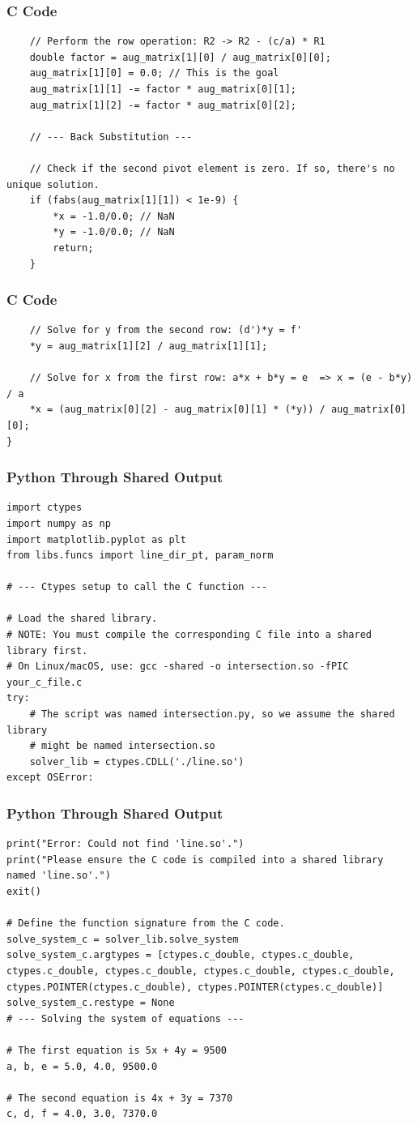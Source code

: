 \documentclass{beamer}
\begin{document}
\begin{frame}[fragile]
\frametitle{C Code}
\begin{lstlisting}
    // Perform the row operation: R2 -> R2 - (c/a) * R1
    double factor = aug_matrix[1][0] / aug_matrix[0][0];
    aug_matrix[1][0] = 0.0; // This is the goal
    aug_matrix[1][1] -= factor * aug_matrix[0][1];
    aug_matrix[1][2] -= factor * aug_matrix[0][2];

    // --- Back Substitution ---

    // Check if the second pivot element is zero. If so, there's no unique solution.
    if (fabs(aug_matrix[1][1]) < 1e-9) {
        *x = -1.0/0.0; // NaN
        *y = -1.0/0.0; // NaN
        return;
    }
\end{lstlisting}
\end{frame}
\begin{frame}[fragile]
\frametitle{C Code}
\begin{lstlisting}
    // Solve for y from the second row: (d')*y = f'
    *y = aug_matrix[1][2] / aug_matrix[1][1];

    // Solve for x from the first row: a*x + b*y = e  => x = (e - b*y) / a
    *x = (aug_matrix[0][2] - aug_matrix[0][1] * (*y)) / aug_matrix[0][0];
}
\end{lstlisting}
\end{frame}
\begin{frame}[fragile]
\frametitle{Python Through Shared Output}
\begin{lstlisting}
import ctypes
import numpy as np
import matplotlib.pyplot as plt
from libs.funcs import line_dir_pt, param_norm

# --- Ctypes setup to call the C function ---

# Load the shared library.
# NOTE: You must compile the corresponding C file into a shared library first.
# On Linux/macOS, use: gcc -shared -o intersection.so -fPIC your_c_file.c
try:
    # The script was named intersection.py, so we assume the shared library
    # might be named intersection.so
    solver_lib = ctypes.CDLL('./line.so')
except OSError:
\end{lstlisting}
\end{frame}
\begin{frame}[fragile]
\frametitle{Python Through Shared Output}
\begin{lstlisting}
print("Error: Could not find 'line.so'.")
print("Please ensure the C code is compiled into a shared library named 'line.so'.")
exit()

# Define the function signature from the C code.
solve_system_c = solver_lib.solve_system
solve_system_c.argtypes = [ctypes.c_double, ctypes.c_double, ctypes.c_double, ctypes.c_double, ctypes.c_double, ctypes.c_double, ctypes.POINTER(ctypes.c_double), ctypes.POINTER(ctypes.c_double)]
solve_system_c.restype = None
# --- Solving the system of equations ---

# The first equation is 5x + 4y = 9500
a, b, e = 5.0, 4.0, 9500.0

# The second equation is 4x + 3y = 7370
c, d, f = 4.0, 3.0, 7370.0
\end{lstlisting}
\end{frame}
\end{document}
